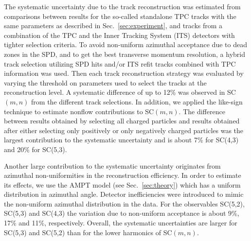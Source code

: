 The systematic uncertainty due to the track reconstruction was estimated from comparisons between results for the so-called standalone TPC tracks with the 
same parameters as described in Sec.~\ref{sec:experiment}, and tracks from a combination of the TPC and the Inner Tracking System (ITS) detectors with tighter selection criteria.
To avoid non-uniform azimuthal acceptance due to dead zones in the SPD, and to get the best transverse momentum resolution, a hybrid track selection utilizing SPD hits and/or ITS refit tracks combined with TPC information was used.
Then each track reconstruction strategy was evaluated by varying the threshold on parameters used to select the tracks at the reconstruction level. 
A systematic difference of up to 12\% was observed in SC$(m,n)$ from the different track selections. 
In addition, we applied the like-sign technique to estimate nonflow contributions to SC$(m,n)$. The difference between results obtained by selecting all charged particles and results obtained after either selecting only positively or only negatively charged particles was the largest contribution to the systematic uncertainty and is about 7\% for SC(4,3) and 20\% for SC(5,3). 

Another large contribution to the systematic uncertainty originates from azimuthal non-uniformities in the reconstruction efficiency. In order to estimate its effects, we use the AMPT model (see Sec.~\ref{sec:theory}) which has a uniform distribution in azimuthal angle.
Detector inefficiencies were introduced to mimic the non-uniform azimuthal distribution in the data. For the observables SC(5,2), SC(5,3) and SC(4,3) the variation due to non-uniform acceptance is about 9\%, 17\% and 11\%, respectively.
Overall, the systematic uncertainties are larger for SC(5,3) and SC(5,2) than for the lower harmonics of SC$(m,n)$.

